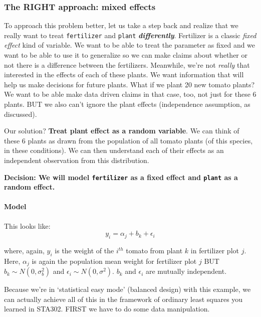 \documentclass[
  openany]{book}
\begin{document}
\hypertarget{the-right-approach-mixed-effects}{%
\subsubsection{The RIGHT approach: mixed effects}\label{the-right-approach-mixed-effects}}

To approach this problem better, let us take a step back and realize that we really want to treat \texttt{fertilizer} and \texttt{plant} \textbf{\emph{differently}}. Fertilizer is a classic \emph{fixed effect} kind of variable. We want to be able to treat the parameter as fixed and we want to be able to use it to generalize so we can make claims about whether or not there is a difference between the fertilizers. Meanwhile, we're not \emph{really} that interested in the effects of each of these plants. We want information that will help us make decisions for future plants. What if we plant 20 new tomato plants? We want to be able make data driven claims in that case, too, not just for these 6 plants. BUT we also can't ignore the plant effects (independence assumption, as discussed).

Our solution? \textbf{Treat plant effect as a random variable}. We can think of these 6 plants as drawn from the population of all tomato plants (of this species, in these conditions). We can then understand each of their effects as an independent observation from this distribution.

\textbf{Decision: We will model \texttt{fertilizer} as a fixed effect and \texttt{plant} as a random effect.}

\hypertarget{model-1}{%
\paragraph{Model}\label{model-1}}

This looks like:
\[ y_i = \alpha_j + b_k + \epsilon_i\]

where, again, \(y_{i}\) is the weight of the \(i^{th}\) tomato from plant \(k\) in fertilizer plot \(j\). Here, \(\alpha_j\) is again the population mean weight for fertilizer plot \(j\) BUT \(b_k \sim N(0, \sigma_b^2)\) and \(\epsilon_i \sim N(0, \sigma^2)\). \(b_k\) and \(\epsilon_i\) are mutually independent.

Because we're in `statistical easy mode' (balanced design) with this example, we can actually achieve all of this in the framework of ordinary least squares you learned in STA302. FIRST we have to do some data manipulation.
\end{document}
